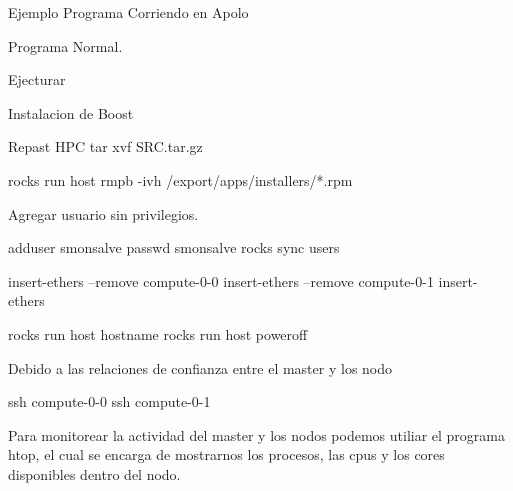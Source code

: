Ejemplo Programa Corriendo en Apolo

Programa Normal. 

Ejecturar





Instalacion de Boost


Repast HPC
tar xvf SRC.tar.gz

rocks run host rmpb -ivh /export/apps/installers/*.rpm


Agregar usuario sin privilegios. 

adduser smonsalve
passwd smonsalve
rocks sync users


insert-ethers --remove compute-0-0
insert-ethers --remove compute-0-1
insert-ethers 

rocks run host hostname
rocks run host poweroff



Debido a las relaciones de confianza entre el master y los nodo


ssh compute-0-0
ssh compute-0-1


Para monitorear la actividad del master y los nodos podemos utiliar el programa htop, el cual se encarga de mostrarnos los procesos, las cpus y los cores disponibles dentro del nodo. 

